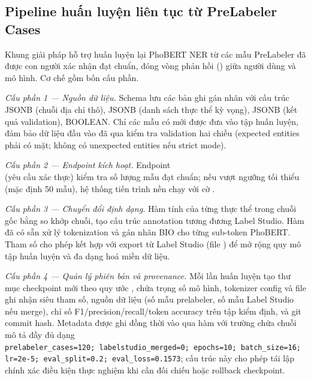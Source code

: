 \subsection{Pipeline huấn luyện liên tục từ PreLabeler Cases}
\label{sec:continuous-training}

Khung giải pháp hỗ trợ huấn luyện lại PhoBERT NER từ các mẫu PreLabeler đã được con người xác nhận đạt chuẩn, đóng vòng phản hồi () giữa người dùng và mô hình. Cơ chế gồm bốn cấu phần.

\emph{Cấu phần 1 --- Nguồn dữ liệu.} Schema  lưu các bản ghi gán nhãn với cấu trúc  JSONB (chuỗi địa chỉ thô),  JSONB (danh sách thực thể kỳ vọng),  JSONB (kết quả validation),  BOOLEAN. Chỉ các mẫu có  mới được đưa vào tập huấn luyện, đảm bảo dữ liệu đầu vào đã qua kiểm tra validation hai chiều (expected entities phải có mặt; không có unexpected entities nếu strict mode).

\emph{Cấu phần 2 --- Endpoint kích hoạt.} Endpoint\\  (yêu cầu xác thực) kiểm tra số lượng mẫu đạt chuẩn; nếu vượt ngưỡng tối thiểu (mặc định 50 mẫu), hệ thống  tiến trình nền chạy  với cờ .

\emph{Cấu phần 3 --- Chuyển đổi định dạng.} Hàm  tính  của từng thực thể trong chuỗi gốc bằng so khớp chuỗi, tạo cấu trúc annotation tương đương Label Studio. Hàm  đã có sẵn xử lý tokenization và gán nhãn BIO cho từng sub-token PhoBERT. Tham số  cho phép kết hợp với export từ Label Studio (file ) để mở rộng quy mô tập huấn luyện và đa dạng hoá miền dữ liệu.

\emph{Cấu phần 4 --- Quản lý phiên bản và provenance.} Mỗi lần huấn luyện tạo thư mục checkpoint mới theo quy ước , chứa trọng số mô hình, tokenizer config và file  ghi nhận siêu tham số, nguồn dữ liệu (số mẫu prelabeler, số mẫu Label Studio nếu merge), chỉ số F1/precision/recall/token accuracy trên tập kiểm định, và git commit hash. Metadata được ghi đồng thời vào  qua hàm  với trường  chứa chuỗi mô tả đầy đủ dạng \\ \texttt{prelabeler\_cases=120; labelstudio\_merged=0; epochs=10; batch\_size=16; lr=2e-5; eval\_split=0.2; eval\_loss=0.1573}; cấu trúc này cho phép tái lập chính xác điều kiện thực nghiệm khi cần đối chiếu hoặc rollback checkpoint.

